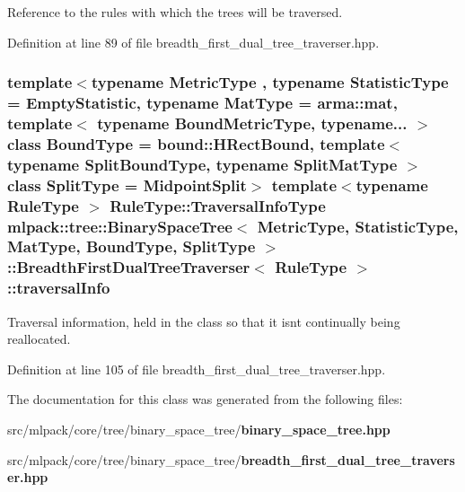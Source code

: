Reference to the rules with which the trees will be traversed. 



Definition at line 89 of file breadth\+\_\+first\+\_\+dual\+\_\+tree\+\_\+traverser.\+hpp.

\subsubsection[{traversal\+Info}]{\setlength{\rightskip}{0pt plus 5cm}template$<$typename Metric\+Type , typename Statistic\+Type  = Empty\+Statistic, typename Mat\+Type  = arma\+::mat, template$<$ typename Bound\+Metric\+Type, typename... $>$ class Bound\+Type = bound\+::\+H\+Rect\+Bound, template$<$ typename Split\+Bound\+Type, typename Split\+Mat\+Type $>$ class Split\+Type = Midpoint\+Split$>$ template$<$typename Rule\+Type $>$ Rule\+Type\+::\+Traversal\+Info\+Type {\bf mlpack\+::tree\+::\+Binary\+Space\+Tree}$<$ Metric\+Type, Statistic\+Type, Mat\+Type, Bound\+Type, Split\+Type $>$\+::{\bf Breadth\+First\+Dual\+Tree\+Traverser}$<$ Rule\+Type $>$\+::traversal\+Info\hspace{0.3cm}{\ttfamily [private]}}\label{classmlpack_1_1tree_1_1BinarySpaceTree_1_1BreadthFirstDualTreeTraverser_adf3709b2d3fd4f6cb6984279597d6eb5}


Traversal information, held in the class so that it isn\textquotesingle{}t continually being reallocated. 



Definition at line 105 of file breadth\+\_\+first\+\_\+dual\+\_\+tree\+\_\+traverser.\+hpp.



The documentation for this class was generated from the following files\+:\begin{DoxyCompactItemize}
\item 
src/mlpack/core/tree/binary\+\_\+space\+\_\+tree/{\bf binary\+\_\+space\+\_\+tree.\+hpp}\item 
src/mlpack/core/tree/binary\+\_\+space\+\_\+tree/{\bf breadth\+\_\+first\+\_\+dual\+\_\+tree\+\_\+traverser.\+hpp}\end{DoxyCompactItemize}
